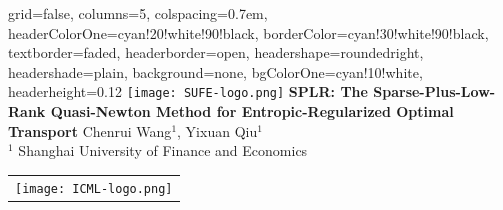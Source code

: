\documentclass[a0paper,landscape]{baposter}
\begin{document}
    \begin{poster}
    {
        grid=false,
        columns=5,
        colspacing=0.7em,
        headerColorOne=cyan!20!white!90!black,
        borderColor=cyan!30!white!90!black,
        textborder=faded,
        headerborder=open,
        headershape=roundedright,
        headershade=plain,
        background=none,
        bgColorOne=cyan!10!white,
        headerheight=0.12\textheight
    }
    {
        \texttt{[image: SUFE-logo.png]}
    }
    {\sc\huge\bf SPLR: The Sparse-Plus-Low-Rank Quasi-Newton Method for Entropic-Regularized Optimal Transport}
    {
        \vspace{0.3em}
        Chenrui Wang$^1$, Yixuan Qiu$^1$ \\[0.2em]
        $^1$ Shanghai University of Finance and Economics \\[0.2em]
    }
    {
        \begin{tabular}{r}
            \texttt{[image: ICML-logo.png]}
        \end{tabular}
    }



\end{poster}
\end{document}
